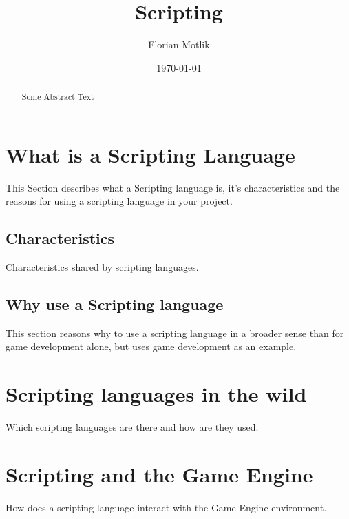 \documentclass{article}
\begin{document}
\author{Florian Motlik}
\title{Scripting}
\date{\today}
\maketitle

\tableofcontents
\newpage

\begin{abstract}
Some Abstract Text
\end{abstract}

\section{What is a Scripting Language}
This Section describes what a Scripting language is, it's characteristics and
the reasons for using a scripting language in your project.
\subsection{Characteristics}
Characteristics shared by scripting languages.
\subsection{Why use a Scripting language}
This section reasons why to use a scripting language in a broader sense than
for game development alone, but uses game development as an example.

\section{Scripting languages in the wild}
Which scripting languages are there and how are they used.

\section{Scripting and the Game Engine}
How does a scripting language interact with the Game Engine environment.
\end{document}
